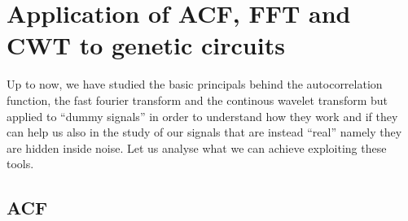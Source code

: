 \documentclass[12pt,a4paper]{report}
\begin{document}





\newpage
\section{Application of ACF, FFT and CWT to genetic circuits}
Up to now, we have studied the basic principals behind the autocorrelation function, the fast fourier transform and the continous wavelet transform but applied to ``dummy signals'' in order to understand how they work and if they can help us also in the study of our signals that are instead ``real'' namely they are hidden inside noise. Let us analyse what we can achieve exploiting these tools.



\subsection{ACF}

\end{document}
